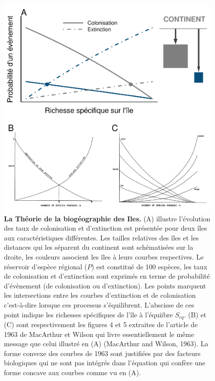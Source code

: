 \begin{figure}[htbp]
\centering
\includegraphics{fig/fig1.pdf}
\caption{\textbf{La Théorie de la biogéographie des Iles.} (A) illustre
l'évolution des taux de colonisation et d'extinction est présentée pour
deux îles aux caractéristiques différentes. Les tailles relatives des
îles et les distances qui les séparent du continent sont schématisées
sur la droite, les couleurs associent les îles à leurs courbes
respectives. Le réservoir d'espèce régional (\(P\)) est constitué de 100
espèces, les taux de colonisation et d'extinction sont exprimés en terme
de probabilité d'évènement (de colonisation ou d'extinction). Les points
marquent les intersections entre les courbes d'extinction et de
colonisation c'est-à-dire lorsque ces processus s'équilibrent.
L'abscisse de ces point indique les richesses spécifiques de l'île à
l'équiibre \(S_{eq}\). (B) et (C) sont respectivement les figures 4 et 5
extraites de l'article de 1963 de MacArthur et Wilson qui livre
essentiellement le même message que celui illustré en (A) (MacArthur and
Wilson, 1963). La forme convexe des courbes de 1963 sont justifiées par
des facteurs biologiques qui ne sont pas intégrés dans l'équation
\label{eqMW} qui confère une forme concave aux courbes comme vu en
(A).\label{fig:figMW}}
\end{figure}

